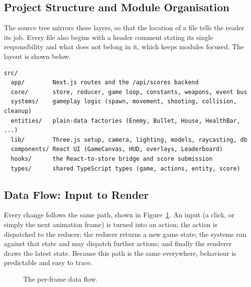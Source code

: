 \documentclass[12pt,a4paper]{report}
\begin{document}
\subsection{Project Structure and Module Organisation}

The source tree mirrors these layers, so that the location of a file tells the
reader its job. Every file also begins with a header comment stating its single
responsibility and what does not belong in it, which keeps modules focused. The
layout is shown below.

\begin{verbatim}
src/
  app/        Next.js routes and the /api/scores backend
  core/       store, reducer, game loop, constants, weapons, event bus
  systems/    gameplay logic (spawn, movement, shooting, collision, cleanup)
  entities/   plain-data factories (Enemy, Bullet, House, HealthBar, ...)
  lib/        Three.js setup, camera, lighting, models, raycasting, db
  components/ React UI (GameCanvas, HUD, overlays, Leaderboard)
  hooks/      the React-to-store bridge and score submission
  types/      shared TypeScript types (game, actions, entity, score)
\end{verbatim}

\subsection{Data Flow: Input to Render}

Every change follows the same path, shown in Figure~\ref{fig:dataflow}. An input
(a click, or simply the next animation frame) is turned into an action; the
action is dispatched to the reducer; the reducer returns a new game state; the
systems run against that state and may dispatch further actions; and finally the
renderer draws the latest state. Because this path is the same everywhere,
behaviour is predictable and easy to trace.

\begin{figure}[H]
\centering
{}
\caption{The per-frame data flow.}
\label{fig:dataflow}
\end{figure}
\end{document}
